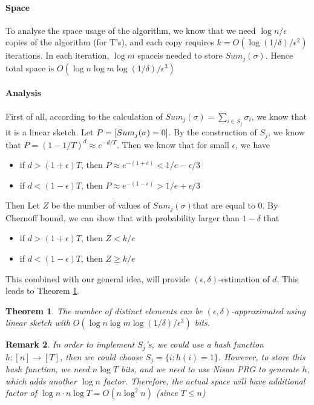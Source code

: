 \documentclass[11pt]{article}
\theoremstyle{plain}
\newtheorem{theorem}{Theorem}[section]
\newtheorem{remark}[theorem]{Remark}
\let\Pr\relax
\DeclareMathOperator*{\Pr}{\mathbb{P}}
\begin{document}
\paragraph{Space}
To analyse the space usage of the algorithm, we know that we need $\log n 
/\epsilon$ copies of the algorithm (for T's), and each copy requires 
$k=O(\log(1/\delta)/\epsilon^2)$ iterations. In each iteration, $\log m $ spaceis 
needed to store $Sum_{j} (\sigma) $. Hence total space is $O(\log 
n\log m \log(1/\delta)/\epsilon^3)$



\paragraph{Analysis}
First of all, according to the calculation of $Sum_{j}(\sigma)=\sum_{i\in S_j} 
\sigma_i$, we know that it is a linear sketch. Let $P=\Pr[Sum_j(\sigma)=0]$. 
By the construction of $S_j$, we know that $P=(1-1/T)^d \approx e^{-d/T}$. 
Then we know that for small $\epsilon$, we have \begin{itemize}
	\item if $d> (1+\epsilon)T$, then $P\approx 
	e^{-(1+\epsilon)}<1/e-\epsilon/3$
 \item if $d< (1-\epsilon)T$, then $P\approx e^{-(1-\epsilon)}>1/e+\epsilon/3$
\end{itemize}
Then Let $Z$ be the number of values of $Sum_{j} (\sigma) $that are equal to 
0. By Chernoff bound, we can show that with probability larger than 
$1-\delta$ that \begin{itemize}
	\item if $d> (1+\epsilon)T$, then $Z<k/e$
	\item if $d< (1-\epsilon)T$, then $Z\geq k/e$
\end{itemize}
This combined with our general idea, will provide $(\epsilon, 
\delta)$-estimation of $d$. This leads to Theorem  \ref{th:linearsketchf0}. 

\begin{theorem}
\label{th:linearsketchf0}
The number of distinct elements can be $(\epsilon, 
\delta)$-approximated using linear sketch with $O(\log 
n\log m \log(1/\delta)/\epsilon^3)$ bits.
\end{theorem}

\begin{remark}
In order to implement $S_j$'s, we could use a hash function $h:[n]\rightarrow 
[T]$, then we could choose $S_j=\{i: h(i)=1\}$. However, to store this hash 
function, we need $n\log T$ bits, and we need to use Nisan PRG to generate 
$h$, which adds another $\log n$ factor. Therefore, the actual space will 
have additional factor of $\log n\cdot n\log T =O(n\log^2 n)$ (since $T\leq n$)
\end{remark}
\end{document}
